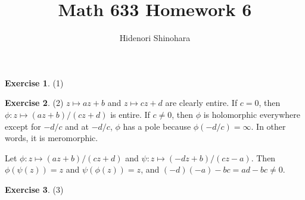 \documentclass[12pt, psamsfonts]{amsart}
\theoremstyle{definition}
\newtheorem*{exer}{Exercise}
\theoremstyle{remark}
\numberwithin{equation}{section}
\begin{document}
\title{Math 633 Homework 6}
\author{Hidenori Shinohara}
\maketitle


\begin{exer}{(1)}
  \todo[inline,caption={}]{
  }
\end{exer}

\begin{exer}{(2)}
  $z \mapsto az + b$ and $z \mapsto cz + d$ are clearly entire.
  If $c = 0$, then $\phi: z \mapsto (az + b) / (cz + d)$ is entire.
  If $c \ne 0$, then $\phi$ is holomorphic everywhere except for $-d / c$ and at $-d / c$, $\phi$ has a pole because $\phi(-d / c) = \infty$.
  In other words, it is meromorphic.

  Let $\phi: z \mapsto (az + b) / (cz + d)$ and $\psi: z \mapsto (-dz + b) / (cz - a)$.
  Then $\phi(\psi(z)) = z$ and $\psi(\phi(z)) = z$, and $(-d)(-a) - bc = ad - bc \ne 0$.

\end{exer}

\begin{exer}{(3)}
  \todo[inline,caption={}]{
  }
\end{exer}
\end{document}
